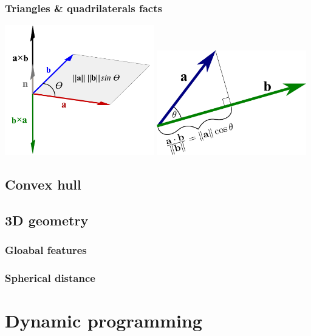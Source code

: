 \documentclass[a4paper]{article}
\begin{document}
\begin{multicols*}{2}
        \subsubsection{Triangles \& quadrilaterals facts}
            
        \includegraphics[width=6.5cm]{../images/Cross-product-with-area.png}
        \includegraphics[width=6.5cm]{../images/dot_product_projection.png}
    \subsection{Convex hull}
        
    \subsection{3D geometry}
        \subsubsection{Gloabal features}
            
        \subsubsection{Spherical distance}
            

\section{Dynamic programming}

\end{multicols*}
\end{document}
